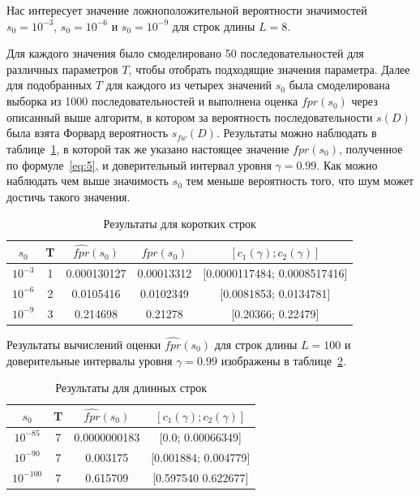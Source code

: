 \documentclass[specialist,
substylefile = spbu_report.rtx,
subf,href,colorlinks=true, 12pt]{disser}
\begin{document}
			Нас интересует значение ложноположительной вероятности значимостей $s_{0}=10^{-3}$, $s_{0}=10^{-6}$ и $s_{0}=10^{-9}$ для строк длины $L=8$.
			
			Для каждого значения было смоделировано 50 последовательностей для различных параметров $T$, чтобы отобрать подходящие значения параметра. Далее для подобранных $T$ для каждого из четырех значений $s_{0}$ была смоделирована выборка из 1000 последовательностей и выполнена оценка $\widehat{fpr}(s_{0})$ через описанный выше алгоритм, в котором за вероятность последовательности $s(D)$ была взята Форвард вероятность $s_{fw}(D)$. Результаты можно наблюдать в таблице~\ref{tb:1}, в которой так же указано настоящее значение $fpr(s_0)$, полученное по формуле~\eqref{eq:5}, и доверительный интервал уровня $\gamma = 0.99$. Как можно наблюдать чем выше значимость $s_{0}$ тем меньше вероятность того, что шум может достичь такого значения.
			\begin{table}
				\centering
				\caption{Результаты для коротких строк} \label{tb:1}
				\begin{tabular}{ccccc}
					$s_{0}$&T&$\widehat{fpr}(s_{0})$&$fpr(s_{0})$&$[c_{1}(\gamma);c_{2}(\gamma)]$  \\ \hline
					$10^{-3}$&1&0.000130127&0.00013312&[0.0000117484; 0.0008517416] \\
					$10^{-6}$&2&0.0105416&0.0102349&[0.0081853; 0.0134781] \\
					$10^{-9}$&3&0.214698&0.21278&[0.20366; 0.22479] \\					
				\end{tabular}
			\end{table}						
						
			 Результаты вычислений оценки $\widehat{fpr}(s_{0})$ для строк длины $L=100$ и доверительные интервалы уровня $\gamma = 0.99$ изображены в таблице~\ref{tb:2}.			 
			 
			 \begin{table}[H]
			 	\centering
			 	\caption{Результаты для длинных строк} \label{tb:2}
			 	\begin{tabular}{cccc}
			 		$s_{0}$&T&$\widehat{fpr}(s_{0})$&$[c_{1}(\gamma);c_{2}(\gamma)]$  \\ \hline
			 		$10^{-85}$&7&0.0000000183&[0.0; 0.00066349] \\
			 		$10^{-90}$&7&0.003175&[0.001884; 0.004779] \\ 
			 		$10^{-100}$&7&0.615709&[0.597540 0.622677] \\
			 	\end{tabular}
			 \end{table}
		 
			
			
			
			\nocite{Stamp2021}
			\nocite{Jurafsky2021}
			\nocite{Rabiner1989}
			\nocite{Newberg2008}
			\renewcommand{\refname}{}
			\vspace{-25pt}
			
			
						
\end{document}
